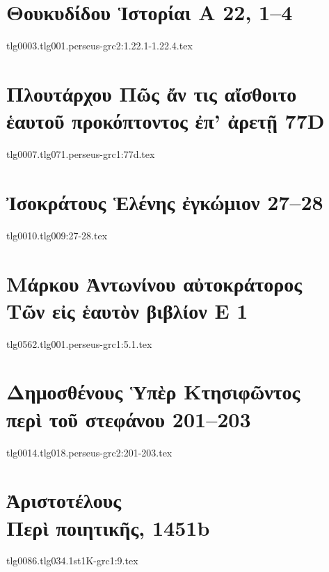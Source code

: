 \documentclass[a4paper,12pt,twoside]{report}
\begin{document}
\chapter[Θουκυδίδου Ἱστορίαι Α]{\textgreek[variant=ancient]{Θουκυδίδου Ἱστορίαι Α} 22, 1–4}

{tlg0003.tlg001.perseus-grc2:1.22.1-1.22.4.tex}

\chapter[Πλουτάρχου Πῶς ἄν τις αἴσθοιτο ἑαυτοῦ\dots]{\textgreek[variant=ancient]{Πλουτάρχου Πῶς ἄν τις αἴσθοιτο ἑαυτοῦ προκόπτοντος ἐπ' ἀρετῇ} 77D}
{tlg0007.tlg071.perseus-grc1:77d.tex}

\chapter[Ἰσοκράτους Ἑλένης ἐγκώμιον 27]{\textgreek[variant=ancient]{Ἰσοκράτους Ἑλένης ἐγκώμιον} 27–28}
{tlg0010.tlg009:27-28.tex}

\chapter[Μάρκου Ἀντωνίνου Τῶν εἰς ἑαυτόν Ε 1]{\textgreek[variant=ancient]{Μάρκου Ἀντωνίνου αὐτοκράτορος \\Τῶν εἰς ἑαυτὸν βιβλίον Ε} 1}
{tlg0562.tlg001.perseus-grc1:5.1.tex}

\chapter[Δημοσθένους Περὶ τοῦ στεφάνου]{\textgreek[variant=ancient]{Δημοσθένους Ὑπὲρ Κτησιφῶντος \\περὶ τοῦ στεφάνου} 201–203}
{tlg0014.tlg018.perseus-grc2:201-203.tex}

\chapter[Ἀριστοτέλους Περὶ ποιητικῆς]{\textgreek[variant=ancient]{Ἀριστοτέλους \\Περὶ ποιητικῆς,} 1451b}

{tlg0086.tlg034.1st1K-grc1:9.tex}
\end{document}
